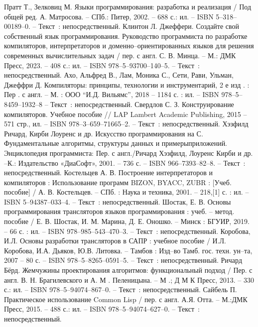 
\begin{thebibliography}{9}
	
	 Пратт Т., Зелковиц М. Языки программирования: разработка и реализация / Под общей ред. А. Матросова. – СПб.: Питер, 2002. – 688 с.: ил. – ISBN 5–318–00189–0. – Текст~: непосредственный.
	 Клинтон Л. Джеффери. Создайте свой собственный язык программирования. Руководство программиста по разработке компиляторов, интерпретаторов и доменно–ориентированных языков для решения современных вычислительных задач / пер. с англ. С. В. Минца. – М.: ДМК Пресс, 2023. – 408 с.: ил. – ISBN 978–5–93700–140–5. – Текст~: непосредственный.
	 Ахо, Альфред В., Лам, Моника С., Сети, Рави, Ульман, Джеффри Д. Компиляторы: принципы, технологии и инструментарий, 2 е изд . : Пер . с англ. – М. : ООО “И.Д. Вильямс”, 2018 – 1184 с. : ил. – ISBN 978–5–8459–1932–8 – Текст~: непосредственный.
		Свердлов С. З. Конструирование компиляторов. Учебное пособие // LAP Lambert Academic Publishing, 2015 – 571 стр., ил. – ISBN 978–3–659–71665–2. – Текст~: непосредственный.
		Хэзфилд Ричард, Кирби Лоуренс и др. Искусство программирования на С. Фундаментальные алгоритмы, структуры данных и примерыприложений. Энциклопедия программиста: Пер. с англ./Ричард Хэзфилд, Лоуренс Кирби и др. –К.: Издательство «ДиаСофт», 2001. – 736 с. – ISBN 966–7393–82–8. – Текст~: непосредственный.
	 Костельцев А. В. Построение интерпретаторов и компиляторов : Использование программ BIZON, BYACC, ZUBR : [Учеб. пособие] / А. В. Костельцев. – СПб. : Наука и техника, 2001. – 218,[1] с. : ил. – ISBN 5–94387–033–4. – Текст~: непосредственный.
	 Шостак, Е. В. Основы программирования трансляторов языков программирования : учеб. – метод. пособие / Е. В. Шостак, И. М. Марина, Д. Е. Оношко. – Минск : БГУИР, 2019. – 66 с. : ил. – ISBN 978–985–543–470–3. – Текст~: непосредственный.
	 Коробова, И.Л. Основы разработки трансляторов в САПР : учебное пособие / И.Л. Коробова, И.А. Дьяков, Ю.В. Литовка. – Тамбов : Изд–во Тамб. гос. техн. ун–та, 2007 – 80 с. – ISBN 978–5–8265–0591–5. – Текст~: непосредственный.
	 Ричард Бёрд. Жемчужины проектирования алгоритмов: функциональный подход / Пер. с англ. В. Н. Брагилевского и А. М . Пеленицына. – М .; Д М К Пресс, 2013. – 330 с.: ил. – ISBN 978–5–94074–867–0. – Текст~: непосредственный.    
	 Сайбель П. Практическое использование Common Lisp / пер. с англ. А.Я. Отта. – М.:ДМК Пресс, 2015. – 488 с.: ил. – ISBN 978–5–94074–627–0. – Текст~: непосредственный.    

\end{thebibliography}
